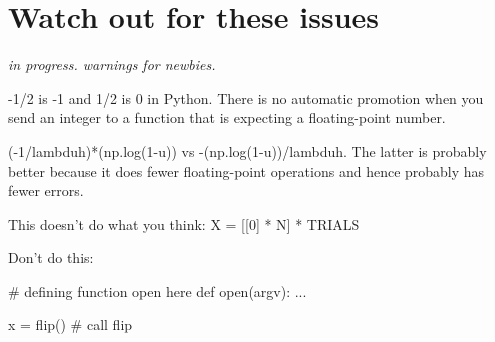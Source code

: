 \chapter{Watch out for these issues}

\begin{fullwidth}
{\em in progress.  warnings for newbies.}

-1/2 is -1 and 1/2 is 0 in Python.  There is no automatic promotion when you send an integer to a function that is expecting a floating-point number.

(-1/lambduh)*(np.log(1-u)) vs -(np.log(1-u))/lambduh. The latter is probably better because it does fewer floating-point operations and hence probably has fewer errors.

This doesn't do what you think: X = [[0] * N] * TRIALS

Don't do this:

\begin{pyverbatim}
# defining function open here
def open(argv):
	...
\end{pyverbatim}

\begin{pyverbatim}
x = flip() # call flip
\end{pyverbatim}

\end{fullwidth}
